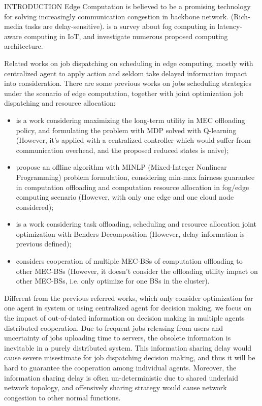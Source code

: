 \documentclass[10pt, conference, letterpaper]{IEEEtran}
\begin{document}
    \begin{section}{INTRODUCTION}
        \label{sec:introduction}
        Edge Computation is believed to be a promising technology for solving increasingly communication congestion in backbone network.
        (Rich-media tasks are delay-sensitive).
        \cite{Naha2018} is a survey about fog computing in latency-aware computing in IoT, and investigate numerous proposed computing architecture.

        Related works on job dispatching on scheduling in edge computing, mostly with centralized agent to apply action and seldom take delayed information impact into consideration.
        There are some previous works on jobs scheduling strategies under the scenario of edge computation, together with joint optimization job dispatching and resource allocation:
        \begin{itemize}
            \item \cite{Zheng2019} is a work considering maximizing the long-term utility in MEC offloading policy, and formulating the problem with MDP solved with Q-learning (However, it's applied with a centralized controller which would suffer from communication overhead, and the proposed reduced states is naive);
            \item \cite{Du2018} propose an offline algorithm with MINLP (Mixed-Integer Nonlinear Programming) problem formulation, considering min-max fairness guarantee in computation offloading and computation resource allocation in fog/edge computing scenario (However, with only one edge and one cloud node considered);
            \item \cite{Alameddine2019} is a work considering task offloading, scheduling and resource allocation joint optimization with Benders Decomposition (However, delay information is previous defined);
            \item \cite{Fan2017} considers cooperation of multiple MEC-BSs of computation offloading to other MEC-BSs (However, it doesn't consider the offloading utility impact on other MEC-BSs, i.e. only optimize for one BSs in the cluster).
        \end{itemize}
        
        Different from the previous referred works, which only consider optimization for one agent in system or using centralized agent for decision making, we focus on the impact of out-of-dated information on decision making in multiple agents distributed cooperation.
        Due to frequent jobs releasing from users and uncertainty of jobs uploading time to servers, the obsolete information is inevitable in a purely distributed system.
        This information sharing delay would cause severe misestimate for job dispatching decision making, and thus it will be hard to guarantee the cooperation among individual agents.
        Moreover, the information sharing delay is often un-deterministic due to shared underlaid network topology, and offensively sharing strategy would cause network congestion to other normal functions.


\end{section}
\end{document}
